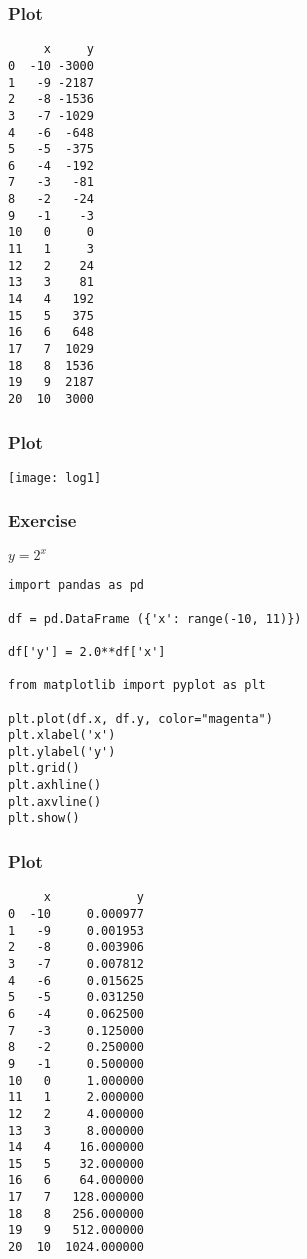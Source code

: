  \begin{frame}[fragile]\frametitle{Plot}
 \begin{lstlisting}
     x     y
0  -10 -3000
1   -9 -2187
2   -8 -1536
3   -7 -1029
4   -6  -648
5   -5  -375
6   -4  -192
7   -3   -81
8   -2   -24
9   -1    -3
10   0     0
11   1     3
12   2    24
13   3    81
14   4   192
15   5   375
16   6   648
17   7  1029
18   8  1536
19   9  2187
20  10  3000
\end{lstlisting}

\end{frame}

 \begin{frame}[fragile]\frametitle{Plot}
\begin{center}
\texttt{[image: log1]}
\end{center}
\end{frame}


 \begin{frame}[fragile]\frametitle{Exercise}
$y = 2^x$

\begin{lstlisting}
import pandas as pd

df = pd.DataFrame ({'x': range(-10, 11)})

df['y'] = 2.0**df['x']

from matplotlib import pyplot as plt

plt.plot(df.x, df.y, color="magenta")
plt.xlabel('x')
plt.ylabel('y')
plt.grid()
plt.axhline()
plt.axvline()
plt.show()
\end{lstlisting}
\end{frame}

 \begin{frame}[fragile]\frametitle{Plot}
 \begin{lstlisting}
     x            y
0  -10     0.000977
1   -9     0.001953
2   -8     0.003906
3   -7     0.007812
4   -6     0.015625
5   -5     0.031250
6   -4     0.062500
7   -3     0.125000
8   -2     0.250000
9   -1     0.500000
10   0     1.000000
11   1     2.000000
12   2     4.000000
13   3     8.000000
14   4    16.000000
15   5    32.000000
16   6    64.000000
17   7   128.000000
18   8   256.000000
19   9   512.000000
20  10  1024.000000
\end{lstlisting}

\end{frame}

